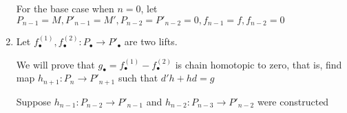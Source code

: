 \documentclass{report}
\begin{document}
\begin{longproof}
\begin{enumerate}
    For the base case when $n=0$, let $P_{n-1} = M, P'_{n-1} = M', P_{n-2} = P'_{n-2} = 0, f_{n-1} = f, f_{n-2} = 0$
    
    \item Let $f^{(1)}_\bullet, f^{(2)}_\bullet: P_\bullet \to P'_\bullet$ are two lifts.
    
    \begin{center}
    \end{center}

    We will prove that $g_\bullet = f^{(1)}_\bullet - f^{(2)}_\bullet$ is chain homotopic to zero, that is, find map $h_{n+1}: P_n \to P'_{n+1}$ such that $d'h + hd = g$

    \begin{center}
    \end{center}

    Suppose $h_{n-1}: P_{n-2} \to P'_{n-1}$ and $h_{n-2}: P_{n-3} \to P'_{n-2}$ were constructed

    \begin{center}
    \end{center}    


\end{enumerate}
\end{longproof}
\end{document}
